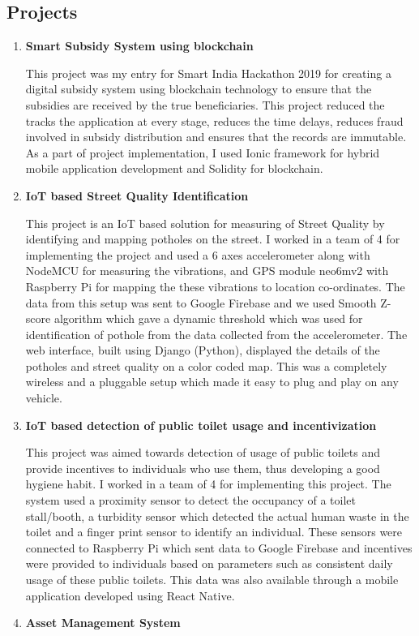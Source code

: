 \documentclass[margin]{res}
\begin{document}
\begin{resume}
\section{Projects}
\begin{enumerate}
  \item {\bf Smart Subsidy System using blockchain}
  
  This project was my entry for Smart India Hackathon 2019 for creating a digital subsidy system using blockchain technology to ensure that the subsidies are received by the true beneficiaries. This project reduced the tracks the application at every stage, reduces the time delays, reduces fraud involved in subsidy distribution and ensures that the records are immutable. As a part of project implementation, I used Ionic framework for hybrid mobile application development and  Solidity for blockchain.
  \item {\bf IoT based Street Quality Identification}
  
  This project is an IoT based solution for measuring of Street Quality by identifying and mapping potholes on the street. I worked in a team of 4 for implementing the project and used a 6 axes accelerometer along with NodeMCU for measuring the vibrations, and GPS module neo6mv2 with Raspberry Pi for mapping the these vibrations to location co-ordinates. The data from this setup was sent to Google Firebase and we used Smooth Z-score algorithm which gave a dynamic threshold which was used for identification of pothole from the data collected from the accelerometer. The web interface, built using Django (Python), displayed the details of the potholes and street quality on a color coded map. This was a completely wireless and a pluggable setup which made it easy to plug and play on any vehicle.
  \item {\bf IoT based detection of public toilet usage and incentivization}
  
  This project was aimed towards detection of usage of public toilets and provide incentives to individuals who use them, thus developing a good hygiene habit. I worked in a team of 4 for implementing this project. The system used a proximity sensor to detect the occupancy of a toilet stall/booth, a turbidity sensor which detected the actual human waste in the toilet and a finger print sensor to identify an individual. These sensors were connected to Raspberry Pi which sent data to Google Firebase and incentives were provided to individuals based on parameters such as consistent daily usage of these public toilets. This data was also available through a mobile application developed using React Native. 
   \item {\bf Asset Management System}
  

\end{enumerate}
\end{resume}
\end{document}
